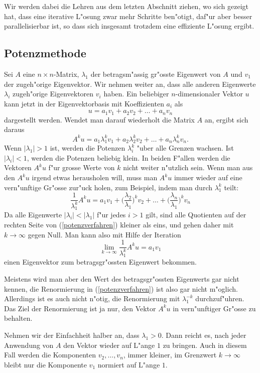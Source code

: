 Wir werden dabei die Lehren aus dem letzten Abschnitt ziehen, wo sich
gezeigt hat, dass eine iterative L"osung zwar mehr Schritte ben"otigt,
daf"ur aber besser parallelisierbar ist, so dass sich insgesamt trotzdem
eine effiziente L"osung ergibt.

\subsection{Potenzmethode}
Sei $A$ eine $n\times n$-Matrix, $\lambda_1$ der betragsm"assig
gr"osste Eigenwert von $A$ und $v_1$ der zugeh"orige Eigenvektor.
Wir nehmen weiter an, dass alle anderen Eigenwerte $\lambda_i$ zugeh"orige
Eigenvektoren $v_i$ haben. Ein beliebiger $n$-dimensionaler Vektor $u$
kann jetzt in der Eigenvektorbasis mit Koeffizienten $a_i$ als
\[
u=
a_1v_1+a_2v_2+\dots+a_nv_n
\]
dargestellt werden.
Wendet man darauf wiederholt die Matrix $A$ an, ergibt sich daraus
\[
A^ku=
a_1\lambda_1^kv_1
+
a_2\lambda_2^kv_2
+
\dots
+
a_n\lambda_n^kv_n.
\]
Wenn $|\lambda_1| > 1$ ist, werden die Potenzen $\lambda_i^k$ "uber
alle Grenzen wachsen.
Ist $|\lambda_i|<1$, werden die Potenzen beliebig klein.
In beiden F"allen werden die Vektoren $A^ku$ f"ur grosse Werte von $k$
nicht weiter n"utzlich sein.
Wenn man aus den $A^ku$ irgend etwas herausholen will, muss man $A^ku$ 
immer wieder auf eine vern"unftige Gr"osse zur"uck holen, zum Beispiel,
indem man durch $\lambda_1^k$ teilt:
\begin{equation}
\frac1{\lambda_1^k}A^ku=a_1v_1
+\biggl(\frac{\lambda_2}{\lambda_1}\biggr)^kv_2
+\dots+
\biggl(\frac{\lambda_n}{\lambda_1}\biggr)^kv_n
\label{potenzverfahren}
\end{equation}
Da alle Eigenwerte $|\lambda_i|<|\lambda_1|$ f"ur jedes $i>1$ gilt,
sind alle Quotienten auf der rechten Seite von (\ref{potenzverfahren})
kleiner als eins, und gehen daher mit $k\to\infty$ gegen Null. Man kann
also mit Hilfe der Iteration
\[
\lim_{k\to\infty}\frac1{\lambda_1^k}A^ku=a_1v_1
\]
einen Eigenvektor zum betragsgr"ossten Eigenwert bekommen.

Meistens wird man aber den Wert des betragsgr"ossten Eigenwerts
gar nicht kennen, die Renormierung in (\ref{potenzverfahren}) 
ist also gar nicht m"oglich.
Allerdings ist es auch nicht n"otig, die Renormierung mit $\lambda_1^{-k}$
durchzuf"uhren.
Das Ziel
der Renormierung ist ja nur, den Vektor $A^ku$ in vern"unftiger
Gr"osse zu behalten.

Nehmen wir der Einfachheit halber an, dass $\lambda_1 > 0$.
Dann reicht es, nach jeder Anwendung von $A$ 
den Vektor wieder auf L"ange $1$ zu bringen.
Auch in diesem Fall werden die Komponenten $v_2,\dots,v_n$, 
immer kleiner, im Grenzwert $k\to\infty$ bleibt nur die Komponente
$v_1$ normiert auf L"ange $1$.

